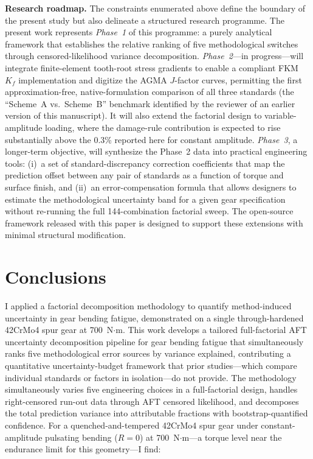 \documentclass[12pt,a4paper]{article}
\begin{document}
\medskip
\noindent\textbf{Research roadmap.}
The constraints enumerated above define the boundary of the present
study but also delineate a structured research programme. The present
work represents \emph{Phase~1} of this programme: a purely analytical
framework that establishes the relative ranking of five
methodological switches through censored-likelihood variance
decomposition. \emph{Phase~2}---in progress---will
integrate finite-element tooth-root stress gradients to enable a
compliant FKM $K_f$ implementation and digitize the AGMA $J$-factor
curves, permitting the first approximation-free, native-formulation
comparison of all three standards (the ``Scheme~A vs.\ Scheme~B''
benchmark identified by the reviewer of an earlier version of this
manuscript). It will also extend the factorial design to
variable-amplitude loading, where the damage-rule contribution is
expected to rise substantially above the 0.3\% reported here for
constant amplitude. \emph{Phase~3}, a longer-term objective, will
synthesize the Phase~2 data into practical engineering tools: (i)~a
set of standard-discrepancy correction coefficients that map the
prediction offset between any pair of standards as a function of
torque and surface finish, and (ii)~an error-compensation formula
that allows designers to estimate the methodological uncertainty
band for a given gear specification without re-running the full
144-combination factorial sweep. The open-source framework released
with this paper is designed to support these extensions with
minimal structural modification.

\section{Conclusions}
\label{sec:conclusions}

I applied a factorial decomposition methodology to quantify
method-induced uncertainty in gear bending fatigue, demonstrated
on a single through-hardened 42CrMo4 spur gear at 700~N$\cdot$m.
This work develops a tailored full-factorial AFT uncertainty
decomposition pipeline for gear bending fatigue that
simultaneously ranks five methodological error sources by variance
explained, contributing a quantitative uncertainty-budget framework
that prior studies---which compare individual standards or factors in
isolation---do not provide.
The methodology
simultaneously varies five engineering choices in a full-factorial
design, handles right-censored run-out data through AFT censored
likelihood, and decomposes the total prediction variance into
attributable fractions with bootstrap-quantified confidence. For a
quenched-and-tempered 42CrMo4 spur gear under constant-amplitude
pulsating bending ($R=0$) at 700~N$\cdot$m---a torque level near the
endurance limit for this geometry---I find:
\end{document}
